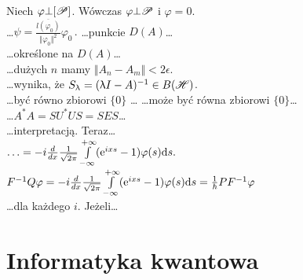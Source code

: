 \documentclass[a4paper,11pt]{article}
\begin{document}
\noindent
{} Niech $\varphi \bot [ \mathcal{P} ]$. Wówczas $\varphi \bot \mathcal{P}$ i $\varphi = 0$. \\
 \ldots$\psi =
\frac{ \overline{ l ( \varphi_{ 0 } ) } }{ \Vert \varphi_{ 0 } \Vert^{ 2 } } \varphi_{ 0 } \, .$
 \ldots punkcie $D( A )$\ldots \\
 \ldots określone na $D( A )$\ldots \\
 \ldots dużych $n$ mamy $\Vert A_{ n } - A_{ m } \Vert < 2 \epsilon$. \\
 \ldots wynika, że $S_{ \uplambda } = ( \uplambda I - A )^{ -1 } \in B( \mathcal{H} )$. \\
 \ldots być równo zbiorowi $\{ 0 \}$ \ldots
{} \ldots może być równa zbiorowi $\{ 0 \}$\ldots \\
 \ldots$A^{ * } A = S U^{ * } U S = S E S$\ldots \\
 \ldots interpretacją. Teraz\ldots \\
 $\ldots = -i \frac{ d }{ dx } \frac{ 1 }{ \sqrt{ 2 \pi } }
\int\limits_{ -\infty }^{ +\infty } ( \mathrm{e}^{ i x s } - 1 ) \varphi( s ) \mathrm{d} s \textrm{.}$ \\
 $F^{ -1 } Q \varphi = -i \frac{ d }{ dx } \frac{ 1 }{ \sqrt{ 2 \pi } }
\int\limits_{ -\infty }^{ +\infty } ( \mathrm{e}^{ i x s } - 1 ) \varphi( s ) \mathrm{d} s
= \frac{ 1 }{ \hbar } P F^{ -1 } \varphi$ \\
 \ldots dla każdego $i$. Jeżeli\ldots


\vspace{\spaceTwo}










\newpage
\section{Informatyka kwantowa}

\vspace{\spaceTwo}





\end{document}
